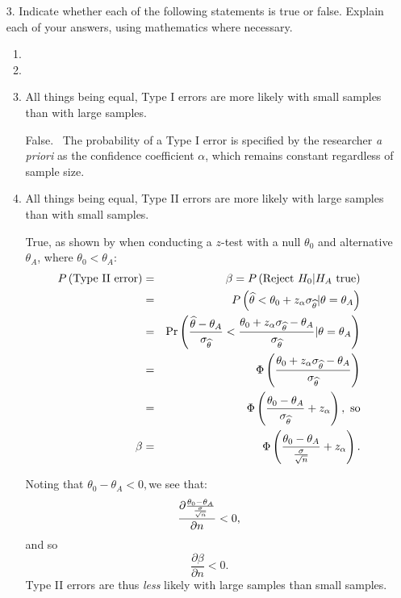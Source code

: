 \documentclass[11pt]{article}
\begin{document}
\begin{enumerate}
\item[3.] Indicate whether each of the following statements is true or
false. Explain each of your answers, using mathematics where necessary.

\begin{enumerate}
\item 

\item 

\item All things being equal, Type I errors are more likely with small
samples than with large samples.

False. \ The probability of a Type I error is specified by the researcher 
\textit{a priori }as the confidence coefficient $\alpha $, which remains
constant regardless of sample size.

\item All things being equal, Type II errors are more likely with large
samples than with small samples.

True, as shown by when conducting a $z$-test with a null $\theta _{0}$ and
alternative $\theta _{A}$, where $\theta _{0}<\theta _{A}$: 
\begin{eqnarray*}
P\left( \text{Type II error}\right)  &=&\beta =P\left( \text{Reject }%
H_{0}|H_{A}\text{ true}\right)  \\
&=&P\left( \widehat{\theta }<\theta _{0}+z_{\alpha }\sigma _{\widehat{\theta 
}}|\theta =\theta _{A}\right)  \\
&=&\Pr \left( \frac{\widehat{\theta }-\theta _{A}}{\sigma _{\widehat{\theta }%
}}<\frac{\theta _{0}+z_{\alpha }\sigma _{\widehat{\theta }}-\theta _{A}}{%
\sigma _{\widehat{\theta }}}|\theta =\theta _{A}\right)  \\
&=&\Phi \left( \frac{\theta _{0}+z_{\alpha }\sigma _{\widehat{\theta }%
}-\theta _{A}}{\sigma _{\widehat{\theta }}}\right)  \\
&=&\Phi \left( \frac{\theta _{0}-\theta _{A}}{\sigma _{\widehat{\theta }}}%
+z_{\alpha }\right) ,\text{ so} \\
\beta  &=&\Phi \left( \frac{\theta _{0}-\theta _{A}}{\frac{\sigma }{\sqrt{n}}%
}+z_{\alpha }\right) .
\end{eqnarray*}

Noting that $\theta _{0}-\theta _{A}<0,$we see that:%
\begin{equation*}
\frac{\partial \frac{\theta _{0}-\theta _{A}}{\frac{\sigma }{\sqrt{n}}}}{%
\partial n}<0,
\end{equation*}%
and so%
\begin{equation*}
\frac{\partial \beta }{\partial n}<0.
\end{equation*}%
Type II errors are thus \textit{less }likely with large samples than small
samples.


\end{enumerate}
\end{enumerate}
\end{document}
